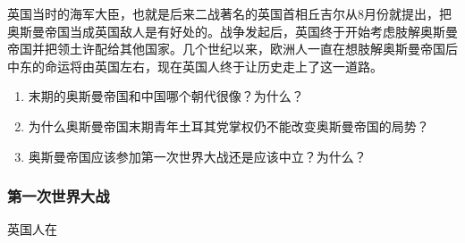 \documentclass{article}
\begin{document}
英国当时的海军大臣，也就是后来二战著名的英国首相丘吉尔从8月份就提出，把奥斯曼帝国当成英国敌人是有好处的。战争发起后，英国终于开始考虑肢解奥斯曼帝国并把领土许配给其他国家。几个世纪以来，欧洲人一直在想肢解奥斯曼帝国后中东的命运将由英国左右，现在英国人终于让历史走上了这一道路。\\
\begin{enumerate}
    \small
    \item 末期的奥斯曼帝国和中国哪个朝代很像？为什么？
    \item 为什么奥斯曼帝国末期青年土耳其党掌权仍不能改变奥斯曼帝国的局势？
    \item 奥斯曼帝国应该参加第一次世界大战还是应该中立？为什么？
\end{enumerate}
\subsubsection{第一次世界大战}
英国人在
\end{document}
